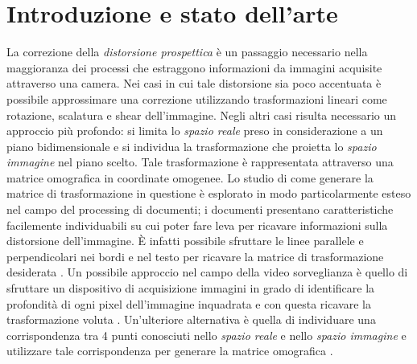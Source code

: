 \chapter{Introduzione e stato dell'arte}
\label{sec:introduzione}

La correzione della \emph{distorsione prospettica} è un passaggio necessario nella maggioranza dei processi che estraggono informazioni da immagini acquisite attraverso una camera.
Nei casi in cui tale distorsione sia poco accentuata è possibile approssimare una correzione utilizzando trasformazioni lineari come rotazione, scalatura e shear dell'immagine.
Negli altri casi risulta necessario un approccio più profondo: si limita lo \emph{spazio reale} preso in considerazione a un piano bidimensionale e si individua la trasformazione che proietta lo \emph{spazio immagine} nel piano scelto.
Tale trasformazione è rappresentata attraverso una matrice omografica in coordinate omogenee.
Lo studio di come generare la matrice di trasformazione in questione è esplorato in modo particolarmente esteso nel campo del processing di documenti; i documenti presentano caratteristiche facilemente individuabili su cui poter fare leva per ricavare informazioni sulla distorsione dell'immagine.
È infatti possibile sfruttare le linee parallele e perpendicolari nei bordi e nel testo per ricavare la matrice di trasformazione desiderata \cite{persp:docs}.
Un possibile approccio nel campo della video sorveglianza è quello di sfruttare un dispositivo di acquisizione immagini in grado di identificare la profondità di ogni pixel dell'immagine inquadrata e con questa ricavare la trasformazione voluta \cite{persp:depth}.
Un'ulteriore alternativa è quella di individuare una corrispondenza tra 4 punti conosciuti nello \emph{spazio reale} e nello \emph{spazio immagine} e utilizzare tale corrispondenza per generare la matrice omografica \cite{persp:map}.

